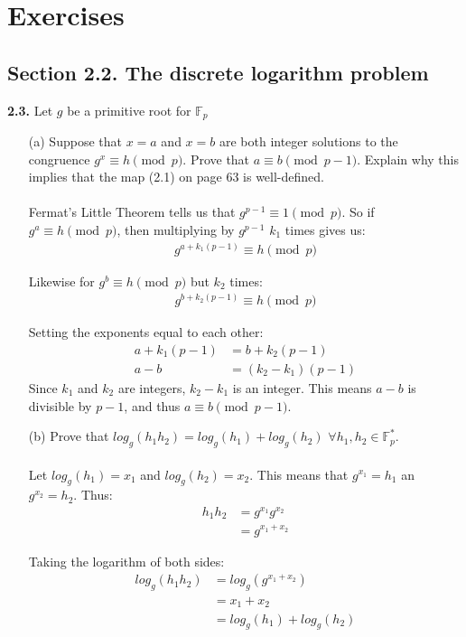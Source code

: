 \documentclass[11pt,fleqn]{article}
\newcommand{\F}{\mathbb{F}}
\begin{document}
\section*{Exercises}

\subsection*{Section 2.2. The discrete logarithm problem}

\textbf{2.3.} Let $g$ be a primitive root for $\F_{p}$
\begin{itemize}
\item[(a)] Suppose that $x = a$ and $x = b$ are both integer solutions to the congruence $g^x \equiv h \pmod{p}$. Prove that $a \equiv b \pmod{p-1}$. Explain why this implies that the map (2.1) on page 63 is well-defined. \\
  \\
Fermat's Little Theorem tells us that $g^{p-1} \equiv 1 \pmod{p}$.  So if $g^a \equiv h \pmod{p}$, then multiplying by $g^{p-1}$ $k_1$ times gives us:
\begin{align}
  g^{a + k_1(p-1)} \equiv h \pmod{p}\nonumber
\end{align}

Likewise for $g^b \equiv h \pmod{p}$ but $k_2$ times:
\begin{align}
  g^{b + k_2(p-1)} \equiv h \pmod{p}\nonumber
\end{align}

Setting the exponents equal to each other:
\begin{align}
  a + k_1(p-1) &= b + k_2(p-1)\nonumber\\
  a - b &= (k_2 - k_1)(p-1)\nonumber
\end{align}
Since $k_1$ and $k_2$ are integers, $k_2 - k_1$ is an integer.  This means $a-b$ is divisible by $p-1$, and thus $a \equiv b \pmod{p-1}$.

\item[(b)] Prove that $log_g (h_1 h_2) = log_g (h_1) + log_g (h_2)$ $\forall h_1, h_2 \in \F_p^*$.\\
  \\
  Let $log_g (h_1) = x_1$ and $log_g (h_2) = x_2$.  This means that $g^{x_1} = h_1$ an $g^{x_2} = h_2$.  Thus:
\begin{align}
  h_1 h_2 &= g^{x_1} g^{x_2}\nonumber\\
          &= g^{x_1 + x_2}\nonumber
\end{align}

Taking the logarithm of both sides:
\begin{align}
  log_g (h_1 h_2) &= log_g (g^{x_1 + x_2})\nonumber\\
  &= x_1 + x_2\nonumber\\
  &= log_g (h_1) + log_g (h_2)\nonumber
\end{align}


\end{itemize}
\end{document}
